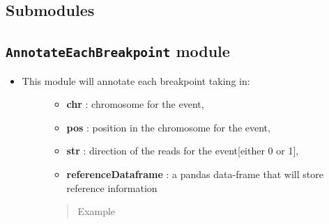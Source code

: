 \documentclass[letterpaper,10pt,english]{sphinxmanual}
\begin{document}
\subsection{Submodules}
\label{iAnnotateSV:submodules}

\subsection{\texttt{AnnotateEachBreakpoint} module}
\label{iAnnotateSV:annotateeachbreakpoint-module}\begin{itemize}
\item {} \begin{description}
\item[{This module will annotate each breakpoint taking in:}] \leavevmode\begin{itemize}
\item {} 
\textbf{chr} : chromosome for the event,

\item {} 
\textbf{pos} : position in the chromosome for the event,

\item {} 
\textbf{str} : direction of the reads for the event{[}either 0 or 1{]},

\item {} 
\textbf{referenceDataframe} : a pandas data-frame that will store reference information

\end{itemize}
\begin{quote}\begin{description}
\item[{Example}] \leavevmode
{}

\end{description}\end{quote}

\end{description}

\end{itemize}
\end{document}
